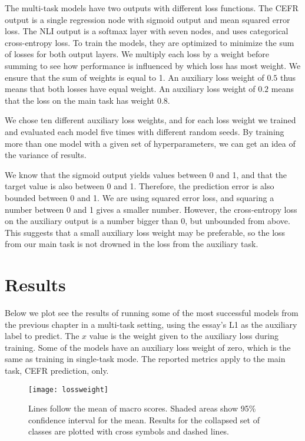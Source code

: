 The multi-task models have two outputs with different loss functions. The
CEFR output is a single regression node with sigmoid output and mean squared
error loss. The NLI output is a softmax layer with seven nodes, and uses
categorical cross-entropy loss. To train the models, they are optimized to
minimize the sum of losses for both output layers. We multiply each loss by a
weight before summing to see how performance is influenced by which loss has
most weight. We ensure that the sum of weights is equal to 1. An auxiliary
loss weight of $0.5$ thus means that both losses have equal weight. An
auxiliary loss weight of $0.2$ means that the loss on the main task has
weight $0.8$.

We chose ten different auxiliary loss weights, and for each loss weight we
trained and evaluated each model five times with different random seeds. By
training more than one model with a given set of hyperparameters, we can get
an idea of the variance of results.

We know that the sigmoid output yields values between 0 and 1, and that the
target value is also between 0 and 1. Therefore, the prediction error is also
bounded between 0 and 1. We are using squared error loss, and squaring a
number between 0 and 1 gives a smaller number. However, the cross-entropy
loss on the auxiliary output is a number bigger than 0, but unbounded from
above. This suggests that a small auxiliary loss weight may be preferable, so
the loss from our main task is not drowned in the loss from the auxiliary
task.

\section{Results}

Below we plot see the results of running some of the most successful models
from the previous chapter in a multi-task setting, using the essay's L1 as
the auxiliary label to predict. The $x$ value is the weight given to the
auxiliary loss during training. Some of the models have an auxiliary loss
weight of zero, which is the same as training in single-task mode.
The reported metrics apply to the main task, CEFR prediction, only.

\begin{figure}
  \centering
  \texttt{[image: lossweight]}
  \caption[Performance of multi-task models]{
    Lines follow the mean of macro \FI scores. Shaded areas show 95\% confidence
    interval for the mean. Results for the collapsed set of classes are plotted with
    cross symbols and dashed lines.
  }
  \label{fig:lossweight}
\end{figure}

